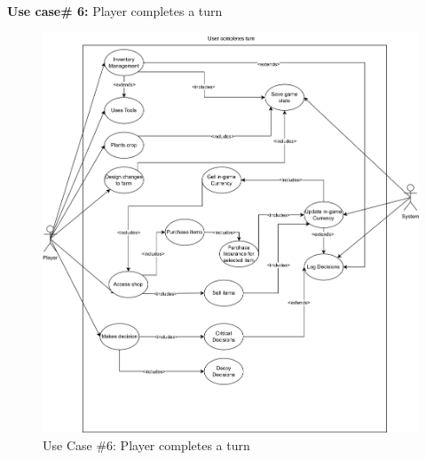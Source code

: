 \documentclass{article}
\begin{document}
\noindent\\
\newpage
\textbf{Use case\# 6:} Player completes a turn\\
\begin{figure}[H]
    \centering

    \includegraphics[width=12cm]{srs_usecase.drawio.png}
    
    \caption{Use Case \#6: Player completes a turn}
    \label{fig:context_diagram}
\end{figure}
\newpage
\end{document}
